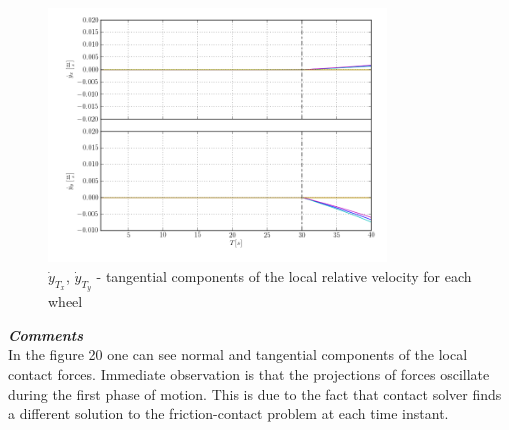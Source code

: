 \begin{figure}[H]
  \centering
    \includegraphics[width=0.8\textwidth]{yTxdotyTzdot4}
  \caption{$\dot{y}_{T_x}$, $\dot{y}_{T_y}$ - tangential components of the local relative velocity for each wheel}
\end{figure}

\noindent \textbf{\textit{\Large{Comments}}}\\[1mm]
\noindent In the figure 20 one can see normal and tangential components of the local contact forces. Immediate observation is that the projections of forces oscillate during the first phase of motion. This
is due to the fact that contact solver finds a different solution to the friction-contact problem at each time instant.\\
